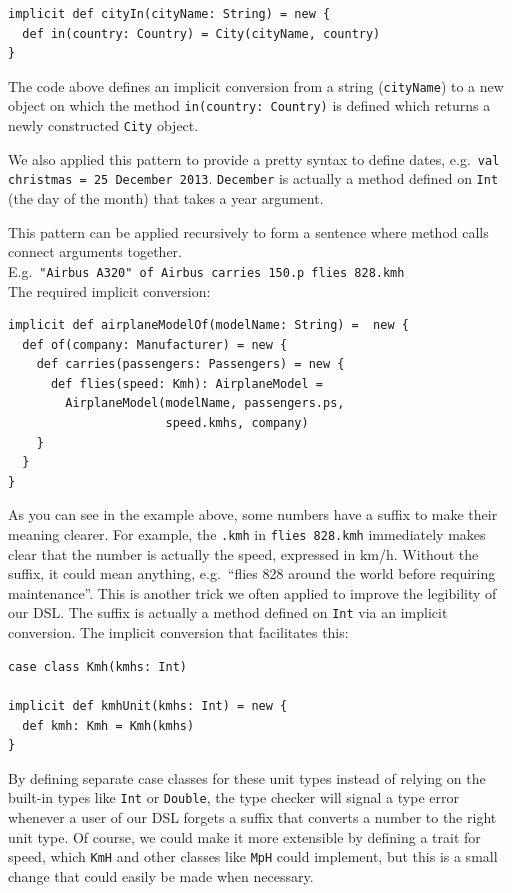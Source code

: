 \documentclass[a4paper]{article}
\newcommand{\cc}[1]{\texttt{#1}}
\renewcommand{\sc}[1]{\lstinline{#1}}
\begin{document}
\begin{lstlisting}
implicit def cityIn(cityName: String) = new {
  def in(country: Country) = City(cityName, country)
}
\end{lstlisting}

The code above defines an implicit conversion from a string (\sc{cityName}) to a new object on which the method \sc{in(country: Country)} is defined which returns a newly constructed \cc{City} object.

We also applied this pattern to provide a pretty syntax to define dates, e.g.\ \sc{val christmas = 25 December 2013}.
\cc{December} is actually a method defined on \cc{Int} (the day of the month) that takes a year argument.

This pattern can be applied recursively to form a sentence where method calls connect arguments together.\\
E.g.\ \sc{"Airbus A320" of Airbus carries 150.p flies 828.kmh}\\
The required implicit conversion:

\begin{lstlisting}
implicit def airplaneModelOf(modelName: String) =  new {
  def of(company: Manufacturer) = new {
    def carries(passengers: Passengers) = new {
      def flies(speed: Kmh): AirplaneModel =
        AirplaneModel(modelName, passengers.ps,
                      speed.kmhs, company)
    }
  }
}
\end{lstlisting}

As you can see in the example above, some numbers have a suffix to make their meaning clearer.
For example, the \sc{.kmh} in \sc{flies 828.kmh} immediately makes clear that the number is actually the speed, expressed in km/h.
Without the suffix, it could mean anything, e.g.\ ``flies 828 around the world before requiring maintenance''.
This is another trick we often applied to improve the legibility of our DSL.
The suffix is actually a method defined on \cc{Int} via an implicit conversion.
The implicit conversion that facilitates this:
\begin{lstlisting}
case class Kmh(kmhs: Int)

implicit def kmhUnit(kmhs: Int) = new {
  def kmh: Kmh = Kmh(kmhs)
}
\end{lstlisting}

By defining separate case classes for these unit types instead of relying on the built-in types like \cc{Int} or \cc{Double}, the type checker will signal a type error whenever a user of our DSL forgets a suffix that converts a number to the right unit type.
Of course, we could make it more extensible by defining a trait for speed, which \cc{KmH} and other classes like \cc{MpH} could implement, but this is a small change that could easily be made when necessary.
\end{document}
